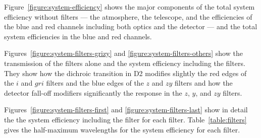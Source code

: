Figure~\ref{figure:system-efficiency} shows the major components of the total system efficiency without filters --- the atmosphere, the telescope, and the efficiencies of the blue and red channels including both optics and the detector --- and the total system efficiencies in the blue and red channels.

Figures~\ref{figure:system-filters-grizy} and \ref{figure:system-filters-others} show the transmission of the filters alone and the system efficiency including the filters. They show how the dichroic transition in D2 modifies slightly the red edges of the $i$ and $gri$ filters and the blue edges of the $z$ and $zy$ filters and how the detector fall-off modifiers significantly the response in the $z$, $y$, and $zy$ filters.

Figures~\ref{figure:system-filters-first} and \ref{figure:system-filters-last} show in detail the the system efficiency including the filter for each filter. Table~\ref{table:filters} gives the half-maximum wavelengths for the system efficiency for each filter.


